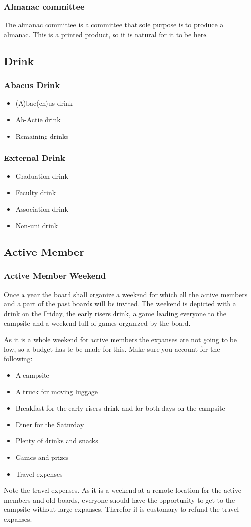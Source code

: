 \documentclass{report}
\begin{document}
\subsubsection{Almanac committee}
The almanac committee is a committee that sole purpose is to produce a almanac. This is a printed product, so it is natural for it to be here.

\subsection{Drink}
\subsubsection{Abacus Drink}
\begin{itemize}
\item (A)bac(ch)us drink
\item Ab-Actie drink
\item Remaining drinks
\end{itemize}
\subsubsection{External Drink}
\begin{itemize}
\item Graduation drink
\item Faculty drink
\item Association drink
\item Non-uni drink
\end{itemize}
\subsection{Active Member}
\subsubsection{Active Member Weekend}
Once a year the board shall organize a weekend for which all the active members and a part of the past boards will be invited. The weekend is depicted with a drink on the Friday, the early risers drink, a game leading everyone to the campsite and a weekend full of games organized by the board. 

As it is a whole weekend for active members the expanses are not going to be low, so a budget has te be made for this. Make sure you account for the following:
\begin{itemize}
	\item A campsite
	\item A truck for moving luggage
	\item Breakfast for the early risers drink and for both days on the campsite
	\item Diner for the Saturday
	\item Plenty of drinks and snacks
	\item Games and prizes
	\item Travel expenses 
\end{itemize}
Note the travel expenses. As it is a weekend at a remote location for the active members and old boards, everyone should have the opportunity to get to the campsite without large expanses. Therefor it is customary to refund the travel expanses.
 
\end{document}
